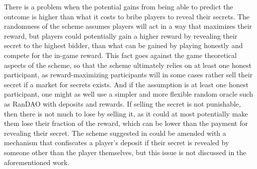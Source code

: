 There is a problem when the potential gains from being able to predict the outcome is higher than what it costs to bribe players to reveal their secrets. The randomness of the scheme assumes players will act in a way that maximizes their reward, but players could potentially gain a higher reward by revealing their secret to the highest bidder, than what can be gained by playing honestly and compete for the in-game reward. This fact goes against the game theoretical aspects of the scheme, so that the scheme ultimately relies on at least one honest participant, as reward-maximizing participants will in some cases rather sell their secret if a market for secrets exists. And if the assumption is at least one honest participant, one might as well use a simpler and more flexible random oracle such as RanDAO with deposits and rewards. If selling the secret is not punishable, then there is not much to lose by selling it, as it could at most potentially make them lose their fraction of the reward, which can be lower than the payment for revealing their secret. The scheme suggested in \cite{chatterjee_probabilistic_2019} could be amended with a mechanism that confiscates a player's deposit if their secret is revealed by someone other than the player themselves, but this issue is not discussed in the aforementioned work.
